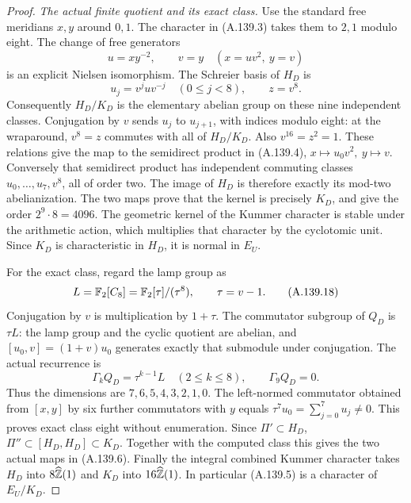 \begin{proof}
\emph{The actual finite quotient and its exact class.}
Use the standard free meridians \(x,y\) around \(0,1\).
The character in (A.139.3) takes them to \(2,1\) modulo eight.
The change of free generators
\[
                         u=xy^{-2},\qquad v=y
                         \quad(x=uv^2,\ y=v)
\tag{A.139.16}
\]
is an explicit Nielsen isomorphism.
The Schreier basis of \(H_D\) is
\[
        u_j=v^juv^{-j}\quad(0\le j<8),\qquad z=v^8.
\tag{A.139.17}
\]
Consequently \(H_D/K_D\) is the elementary abelian group on these
nine independent classes.
Conjugation by \(v\) sends \(u_j\) to \(u_{j+1}\), with indices
modulo eight: at the wraparound, \(v^8=z\) commutes with all of
\(H_D/K_D\).
Also \(v^{16}=z^2=1\).
These relations give the map to the semidirect product in
(A.139.4), \(x\mapsto u_0v^2,\ y\mapsto v\).
Conversely that semidirect product has independent commuting
classes \(u_0,\ldots,u_7,v^8\), all of order two.
The image of \(H_D\) is therefore exactly its mod-two abelianization.
The two maps prove that the kernel is precisely \(K_D\), and give
the order \(2^9\cdot8=4096\).
The geometric kernel of the Kummer character is stable under the
arithmetic action, which multiplies that character by the
cyclotomic unit.  Since \(K_D\) is characteristic in \(H_D\),
it is normal in \(E_U\).

For the exact class, regard the lamp group as
\[
 L=\mathbb F_2[C_8]=\mathbb F_2[\tau]/(\tau^8),\qquad \tau=v-1.
\tag{A.139.18}
\]
Conjugation by \(v\) is multiplication by \(1+\tau\).
The commutator subgroup of \(Q_D\) is \(\tau L\):
the lamp group and the cyclic quotient are abelian, and
\([u_0,v]=(1+v)u_0\) generates exactly that submodule under
conjugation.  The actual recurrence is
\[
       \Gamma_kQ_D=\tau^{k-1}L\quad(2\le k\le8),\qquad
       \Gamma_9Q_D=0.
\tag{A.139.19}
\]
Thus the dimensions are \(7,6,5,4,3,2,1,0\).
The left-normed commutator obtained from \([x,y]\) by six further
commutators with \(y\) equals
\(\tau^7u_0=\sum_{j=0}^7u_j\ne0\).
This proves exact class eight without enumeration.
Since \(\Pi'\subset H_D\),
\(\Pi''\subset[H_D,H_D]\subset K_D\).
Together with the computed class this gives the two actual maps
in (A.139.6).
Finally the integral combined Kummer character takes \(H_D\) into
\(8\widehat{\mathbb Z}(1)\) and \(K_D\) into \(16\widehat{\mathbb Z}(1)\).
In particular (A.139.5) is a character of \(E_U/K_D\).


\end{proof}
